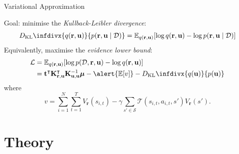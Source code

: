 \documentclass{beamer}
\newcommand{\Kuu}{\mathbf{K}_{\mathbf{u},\mathbf{u}}}
\newcommand{\Kru}{\mathbf{K}_{\mathbf{r},\mathbf{u}}}
\newcommand{\V}{V_{\mathbf{r}}}
\newcommand{\DKL}{D_{\mathrm{KL}}\infdivx}
\begin{document}
\begin{frame}{Variational Approximation}
  \begin{figure}
    \centering
  \end{figure}
  Goal: \alert{minimise} the \emph{Kullback-Leibler divergence}:
  \[
    \DKL{q(\mathbf{r}, \mathbf{u})}{p(\mathbf{r}, \mathbf{u} \mid \mathcal{D})}
    = \mathbb{E}_{q(\mathbf{r}, \mathbf{u})}[\log q(\mathbf{r}, \mathbf{u}) -
    \log p(\mathbf{r}, \mathbf{u} \mid \mathcal{D})]
  \]
  Equivalently, \alert{maximise} the \emph{evidence lower bound}:
  \begin{align*}
    \mathcal{L} &= \mathbb{E}_{q(\mathbf{r}, \mathbf{u})}[\log p(\mathcal{D}, \mathbf{r}, \mathbf{u}) - \log q(\mathbf{r}, \mathbf{u})] \\
                &= \mathbf{t}^\intercal\Kru^\intercal\Kuu^{-1}\bm\mu - \alert{\mathbb{E}[v]} - \DKL{q(\mathbf{u})}{p(\mathbf{u})}
  \end{align*}
  where
  \[
    v = \sum_{i=1}^N \sum_{t=1}^T \V(s_{i,t}) - \gamma\sum_{s' \in \mathcal{S}}
    \mathcal{T}(s_{i,t}, a_{i,t}, s')\V(s').
  \]
\end{frame}

\section{Theory}
\end{document}
